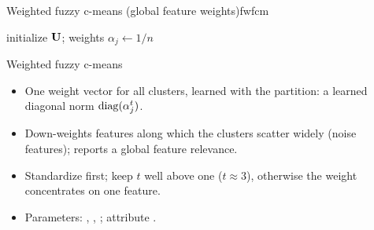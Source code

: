 \begin{algobox}{Weighted fuzzy c-means (global feature weights)}{fwfcm}
\begin{algorithm}[H]
initialize $\mathbf{U}$; weights $\alpha_j\leftarrow1/n$\;
\end{algorithm}
\end{algobox}
\begin{summarybox}{Weighted fuzzy c-means}
\begin{itemize}
  \item One weight vector for all clusters, learned with the partition: a learned diagonal norm $\operatorname{diag}(\alpha_j^t)$.
  \item Down-weights features along which the clusters scatter widely (noise features); reports a global feature relevance.
  \item Standardize first; keep $t$ well above one ($t\approx3$), otherwise the weight concentrates on one feature.
  \item Parameters: , , ; attribute .
\end{itemize}
\end{summarybox}

